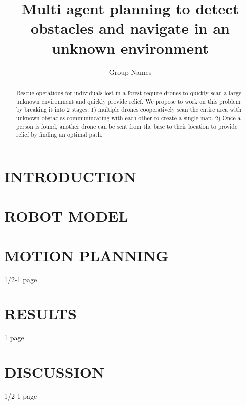 \documentclass[letterpaper, 10 pt, conference]{ieeeconf}  %
\title{\LARGE \bf Multi agent planning to detect obstacles and navigate in an unknown environment}
\author{Group Names}%
\begin{document}
\maketitle
\thispagestyle{empty}
\pagestyle{empty}


\begin{abstract}
 Rescue operations for individuals lost in a forest require drones to quickly scan a large unknown environment and quickly provide relief. We propose to work on this problem by breaking it into 2 stages. 1) multiple drones cooperatively scan the entire area with unknown obstacles communincating with each other to create a single map. 2) Once a person is found, another drone can be sent from the base to their location to provide relief by finding an optimal path.
\end{abstract}

\section{INTRODUCTION}

\section{ROBOT MODEL}
 
\section{MOTION PLANNING}
 1/2-1 page

\section{RESULTS}
1 page

\section{DISCUSSION}
1/2-1 page
 

\addtolength{\textheight}{-12cm}   %
\end{document}

